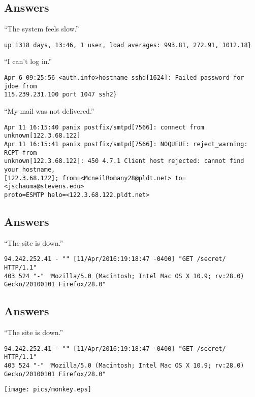 \documentclass[xga]{xdvislides}
\begin{document}
\subsection{Answers}
``The system feels slow.''
\begin{verbatim}
up 1318 days, 13:46, 1 user, load averages: 993.81, 272.91, 1012.18}
\end{verbatim}

\addvspace{.3in}
``I can't log in.''
\begin{verbatim}
Apr 6 09:25:56 <auth.info>hostname sshd[1624]: Failed password for jdoe from
115.239.231.100 port 1047 ssh2}
\end{verbatim}

\addvspace{.3in}
``My mail was not delivered.''
\begin{verbatim}
Apr 11 16:15:40 panix postfix/smtpd[7566]: connect from unknown[122.3.68.122]
Apr 11 16:15:41 panix postfix/smtpd[7566]: NOQUEUE: reject_warning: RCPT from
unknown[122.3.68.122]: 450 4.7.1 Client host rejected: cannot find your hostname,
[122.3.68.122]; from=<McneilRomany28@pldt.net> to=<jschauma@stevens.edu>
proto=ESMTP helo=<122.3.68.122.pldt.net>
\end{verbatim}

\subsection{Answers}
``The site is down.'' \\

\begin{verbatim}
94.242.252.41 - "" [11/Apr/2016:19:18:47 -0400] "GET /secret/ HTTP/1.1"
403 524 "-" "Mozilla/5.0 (Macintosh; Intel Mac OS X 10.9; rv:28.0)
Gecko/20100101 Firefox/28.0"
\end{verbatim}

\subsection{Answers}
``The site is down.'' \\

\begin{verbatim}
94.242.252.41 - "" [11/Apr/2016:19:18:47 -0400] "GET /secret/ HTTP/1.1"
403 524 "-" "Mozilla/5.0 (Macintosh; Intel Mac OS X 10.9; rv:28.0)
Gecko/20100101 Firefox/28.0"
\end{verbatim}

\addvspace{.2in}
\begin{center}
	\texttt{[image: pics/monkey.eps]}
\end{center}
\end{document}
